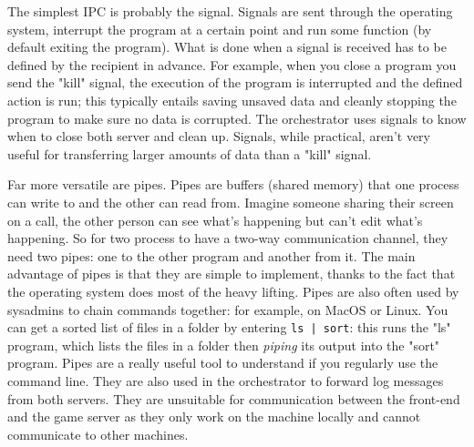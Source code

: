 The simplest IPC is probably the signal. Signals are sent through the operating system, interrupt the program at a
certain point and run some function (by default exiting the program). What is done when a signal is received has to be
defined by the recipient in advance. For example, when you close a program you send the "kill" signal, the
execution of the program is interrupted and the defined action is run; this typically entails saving unsaved data and
cleanly stopping the program to make sure no data is corrupted. The orchestrator uses signals to know when to close
both server and clean up. Signals, while practical, aren't very useful for transferring larger amounts of data than a "kill" signal.

Far more versatile are pipes. Pipes are buffers (shared memory) that one process can write to and the other can read from. Imagine
someone sharing their screen on a call, the other person can see what's happening but can't edit what's happening. So
for two process to have a two-way communication channel, they need two pipes: one to the other program and another from
it. The main advantage of pipes is that they are simple to implement, thanks to the fact that the operating system
does most of the heavy lifting. Pipes are also often used by sysadmins to chain commands together: for example, on MacOS
or Linux. You can get a sorted list of files in a folder by entering \texttt{ls | sort}: this runs the "ls" program,
which lists the files in a folder then \textit{piping} its output into the "sort" program. Pipes are a really useful tool to
understand if you regularly use the command line. They are also used in the orchestrator to forward log messages from
both servers. They are unsuitable for communication between the front-end and the game server as they only work on the
machine locally and cannot communicate to other machines.

